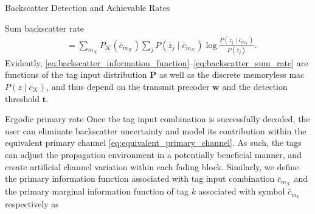 \documentclass[journal]{IEEEtran}
\begin{document}
\begin{section}{Backscatter Detection and Achievable Rates}
\begin{subsection}{Sum backscatter rate}
\begin{subequations}
\begin{align}
					& = \sum_{m_{\mathcal{K}}} P_{\mathcal{K}}(\bar{c}_{m_{\mathcal{K}}}) \sum_j P(\bar{z}_j \mid \bar{c}_{m_{\mathcal{K}}}) \log \frac{P(\bar{z}_j \mid \bar{c}_{m_{\mathcal{K}}})}{P(\bar{z}_j)}.\label{eq:backscatter_sum_rate_expansion}
				\end{align}
				\label{eq:backscatter_sum_rate}
			\end{subequations}
			Evidently, \eqref{eq:backscatter_information_function}--\eqref{eq:backscatter_sum_rate} are functions of the tag input distribution $\boldsymbol{P}$ as well as the discrete memoryless \gls{mac} $P(z \mid c_{\mathcal{K}})$, and thus depend on the transmit precoder $\boldsymbol{w}$ and the detection threshold $\boldsymbol{t}$.
		\end{subsection}

		\begin{subsection}{Ergodic primary rate}
			Once the tag input combination is successfully decoded, the user can eliminate backscatter uncertainty and model its contribution within the equivalent primary channel \eqref{eq:equivalent_primary_channel}. As such, the tags can adjust the propagation environment in a potentially beneficial manner, and create artificial channel variation within each fading block. Similarly, we define the primary information function associated with tag input combination $\bar{c}_{m_{\mathcal{K}}}$ and the primary marginal information function of tag $k$ associated with symbol $\bar{c}_{m_k}$ respectively as


\end{subsection}
\end{section}
\end{document}
